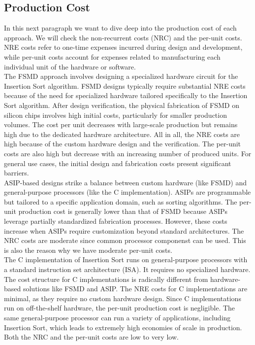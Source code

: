 \documentclass[conference]{IEEEtran}
\begin{document}
\subsection{Production Cost}
In this next paragraph we want to dive deep into the production cost of each approach. We will check the non-recurrent costs (NRC) and the per-unit costs. NRE costs refer to one-time expenses incurred during design and development, while per-unit costs account for expenses related to manufacturing each individual unit of the hardware or software.\\
The FSMD approach involves designing a specialized hardware circuit for the Insertion Sort algorithm. FSMD designs typically require substantial NRE costs because of the need for specialized
hardware tailored specifically to the Insertion Sort algorithm. After design verification, the physical fabrication of FSMD on silicon chips involves high initial costs, particularly for smaller production volumes. The cost per unit decreases with large-scale production but remains high due to the dedicated hardware architecture. All in all, the NRE costs are high because of the custom hardware design and the verification. The per-unit costs are also high but decrease with an increasing number of produced units. For general use cases, the initial design and fabrication costs present significant barriers.\\
ASIP-based designs strike a balance between custom hardware (like FSMD) and general-purpose processors (like the C implementation). ASIPs are programmable but tailored to a specific application domain, such as sorting algorithms. The per-unit production cost is generally lower than that of FSMD because ASIPs leverage partially standardized fabrication processes. However, these costs increase when ASIPs require customization beyond standard architectures. 
The NRC costs are moderate since common processor componenst can be used. This is also the reason why we have moderate per-unit costs.\\
The C implementation of Insertion Sort runs on general-purpose processors with a standard instruction set architecture (ISA). It requires no specialized hardware. The cost structure for C implementations is radically different from hardware-based solutions like FSMD and ASIP. The NRE costs for C implementations are minimal, as they require no custom hardware design. Since C implementations run on off-the-shelf hardware, the per-unit production cost is negligible. The same general-purpose processor can run a variety of applications, including Insertion Sort, which leads to extremely high economies of scale in production. Both the NRC and the per-unit costs are low to very low. 
\end{document}

